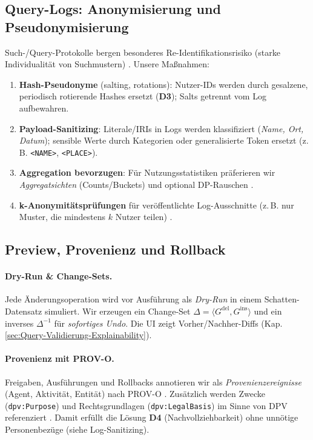 \subsection{Query-Logs: Anonymisierung und Pseudonymisierung}
\label{subsec:log-anon}

Such-/Query-Protokolle bergen besonderes Re-Identifikationsrisiko (starke Individualität von Suchmustern) \cite{goetz2012publishing_search_logs,navarro_arribas2012_user_kanon_querylogs,adar2007user4xxxxx9}. Unsere Maßnahmen:

\begin{enumerate}
  \item \textbf{Hash-Pseudonyme} (salting, rotations): Nutzer-IDs werden durch gesalzene, periodisch rotierende Hashes ersetzt (\textbf{D3}); Salts getrennt vom Log aufbewahren.
  \item \textbf{Payload-Sanitizing}: Literale/IRIs in Logs werden klassifiziert (\emph{Name, Ort, Datum}); sensible Werte durch Kategorien oder generalisierte Token ersetzt (z.\,B. \texttt{<NAME>}, \texttt{<PLACE>}). 
  \item \textbf{Aggregation bevorzugen}: Für Nutzungsstatistiken präferieren wir \emph{Aggregatsichten} (Counts/Buckets) und optional DP-Rauschen \cite{goetz2012publishing_search_logs}.
  \item \textbf{k-Anonymitätsprüfungen} für veröffentlichte Log-Ausschnitte (z.\,B. nur Muster, die mindestens $k$ Nutzer teilen) \cite{navarro_arribas2012_user_kanon_querylogs}.
\end{enumerate}

\subsection{Preview, Provenienz und Rollback}
\label{subsec:preview-logging}

\paragraph{Dry-Run \& Change-Sets.}
Jede Änderungsoperation wird vor Ausführung als \emph{Dry-Run} in einem Schatten-Datensatz simuliert. Wir erzeugen ein Change-Set $\Delta= \langle G^{\mathrm{del}},G^{\mathrm{ins}}\rangle$ und ein inverses $\Delta^{-1}$ für \emph{sofortiges Undo}. Die UI zeigt Vorher/Nachher-Diffs (Kap.\,\ref{sec:Query-Validierung-Explainability}).

\paragraph{Provenienz mit PROV-O.}
Freigaben, Ausführungen und Rollbacks annotieren wir als \emph{Provenienzereignisse} (Agent, Aktivität, Entität) nach PROV-O \cite{w3c_prov_o}. Zusätzlich werden Zwecke (\texttt{dpv:Purpose}) und Rechtsgrundlagen (\texttt{dpv:LegalBasis}) im Sinne von DPV referenziert \cite{dpv_w3c_note}. Damit erfüllt die Lösung \textbf{D4} (Nachvollziehbarkeit) ohne unnötige Personenbezüge (siehe Log-Sanitizing).


